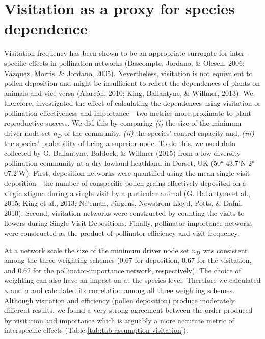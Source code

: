 \documentclass[a4paper]{artikel1}
\theoremstyle{definition}
\theoremstyle{definition}
\theoremstyle{definition}
\theoremstyle{remark}
\begin{document}
\clearpage 

\section{Visitation as a proxy for species
dependence}\label{visitation-as-proxy}

Visitation frequency has been shown to be an appropriate surrogate for
inter-specific effects in pollination networks (Bascompte, Jordano, \&
Olesen, 2006; Vázquez, Morris, \& Jordano, 2005). Nevertheless,
visitation is not equivalent to pollen deposition and might be
insufficient to reflect the dependences of plants on animals and vice
versa (Alarcón, 2010; King, Ballantyne, \& Willmer, 2013). We,
therefore, investigated the effect of calculating the dependences using
visitation or pollination effectiveness and importance---two metrics
more proximate to plant reproductive success. We did this by comparing
\emph{(i)} the size of the minimum driver node set \(n_D\) of the
community, \emph{(ii)} the species' control capacity and, \emph{(iii)}
the species' probability of being a superior node. To do this, we used
data collected by G. Ballantyne, Baldock, \& Willmer (2015) from a low
diversity pollination community at a dry lowland heathland in Dorset, UK
(50° 43.7'N 2° 07.2'W). First, deposition networks were quantified using
the mean single visit deposition---the number of conspecific pollen
grains effectively deposited on a virgin stigma during a single visit by
a particular animal (G. Ballantyne et al., 2015; King et al., 2013;
Ne'eman, Jürgens, Newstrom-Lloyd, Potts, \& Dafni, 2010). Second,
visitation networks were constructed by counting the visits to flowers
during Single Visit Depositions. Finally, pollinator importance networks
were constructed as the product of pollinator efficiency and visit
frequency.

At a network scale the size of the minimum driver node set \(n_D\) was
consistent among the three weighting schemes (0.67 for deposition, 0.67
for the visitation, and 0.62 for the pollinator-importance network,
respectively). The choice of weighting can also have an impact on at the
species level. Therefore we calculated \(\phi\) and \(\sigma\) and
calculated its correlation among all three weighting schemes. Although
visitation and efficiency (pollen deposition) produce moderately
different results, we found a very strong agreement between the order
produced by visitation and importance which is arguably a more accurate
metric of interspecific effects (Table
\ref{tab:tab-assumption-visitation}).
\end{document}
